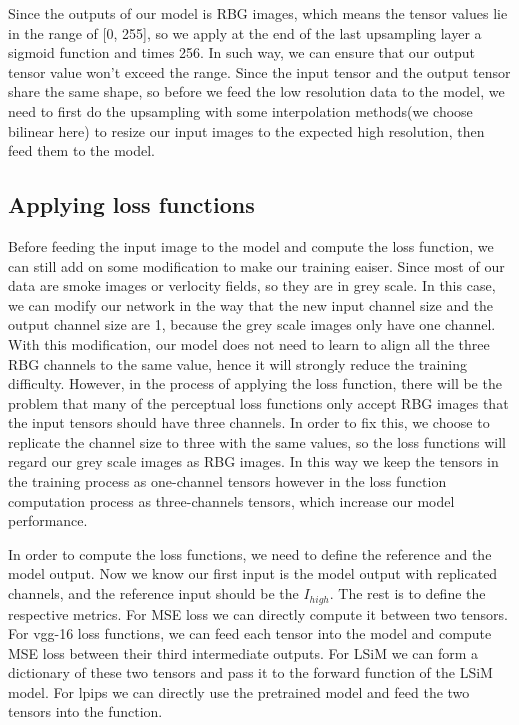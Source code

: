 \documentclass[a4paper,12pt,twoside]{report}
\begin{document}
Since the outputs of our model is RBG images, which means the tensor values lie in the range of [0, 255], so we apply at the end of the last upsampling layer a sigmoid function and times 256. In such way, we can ensure that our output tensor value won't exceed the range. Since the input tensor and the output tensor share the same shape, so before we feed the low resolution data to the model, we need to first do the upsampling with some interpolation methods(we choose bilinear here) to resize our input images to the expected high resolution, then feed them to the model. 

\subsection{Applying loss functions}
Before feeding the input image to the model and compute the loss function, we can still add on some modification to make our training eaiser. Since most of our data are smoke images or verlocity fields, so they are in grey scale. In this case, we can modify our network in the way that the new input channel size and the output channel size are 1, because the grey scale images only have one channel. With this modification, our model does not need to learn to align all the three RBG channels to the same value, hence it will strongly reduce the training difficulty. However, in the process of applying the loss function, there will be the problem that many of the perceptual loss functions only accept RBG images that the input tensors should have three channels. In order to fix this, we choose to replicate the channel size to three with the same values, so the loss functions will regard our grey scale images as RBG images. In this way we keep the tensors in the training process as one-channel tensors however in the loss function computation process as three-channels tensors, which increase our model performance.

In order to compute the loss functions, we need to define the reference and the model output. Now we know our first input is the model output with replicated channels, and the reference input should be the $I_{high}$. The rest is to define the respective metrics. For MSE loss we can directly compute it between two tensors. For vgg-16 loss functions, we can feed each tensor into the model and compute MSE loss between their third intermediate outputs. For LSiM we can form a dictionary of these two tensors and pass it to the forward function of the LSiM model. For lpips we can directly use the pretrained model and feed the two tensors into the function.
\end{document}
